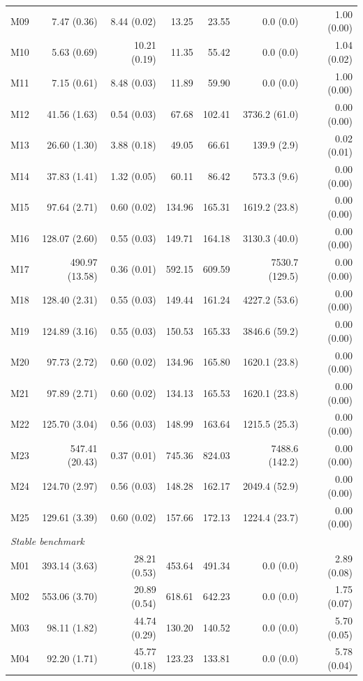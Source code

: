 \documentclass[11pt]{article}
\theoremstyle{remark}
\begin{document}
\begin{longtable}{lrrrrrr}
M09 & 7.47 (0.36) & 8.44 (0.02) & 13.25 & 23.55 & 0.0 (0.0) & 1.00 (0.00) \\
M10 & 5.63 (0.69) & 10.21 (0.19) & 11.35 & 55.42 & 0.0 (0.0) & 1.04 (0.02) \\
M11 & 7.15 (0.61) & 8.48 (0.03) & 11.89 & 59.90 & 0.0 (0.0) & 1.00 (0.00) \\
M12 & 41.56 (1.63) & 0.54 (0.03) & 67.68 & 102.41 & 3736.2 (61.0) & 0.00 (0.00) \\
M13 & 26.60 (1.30) & 3.88 (0.18) & 49.05 & 66.61 & 139.9 (2.9) & 0.02 (0.01) \\
M14 & 37.83 (1.41) & 1.32 (0.05) & 60.11 & 86.42 & 573.3 (9.6) & 0.00 (0.00) \\
M15 & 97.64 (2.71) & 0.60 (0.02) & 134.96 & 165.31 & 1619.2 (23.8) & 0.00 (0.00) \\
M16 & 128.07 (2.60) & 0.55 (0.03) & 149.71 & 164.18 & 3130.3 (40.0) & 0.00 (0.00) \\
M17 & 490.97 (13.58) & 0.36 (0.01) & 592.15 & 609.59 & 7530.7 (129.5) & 0.00 (0.00) \\
M18 & 128.40 (2.31) & 0.55 (0.03) & 149.44 & 161.24 & 4227.2 (53.6) & 0.00 (0.00) \\
M19 & 124.89 (3.16) & 0.55 (0.03) & 150.53 & 165.33 & 3846.6 (59.2) & 0.00 (0.00) \\
M20 & 97.73 (2.72) & 0.60 (0.02) & 134.96 & 165.80 & 1620.1 (23.8) & 0.00 (0.00) \\
M21 & 97.89 (2.71) & 0.60 (0.02) & 134.13 & 165.53 & 1620.1 (23.8) & 0.00 (0.00) \\
M22 & 125.70 (3.04) & 0.56 (0.03) & 148.99 & 163.64 & 1215.5 (25.3) & 0.00 (0.00) \\
M23 & 547.41 (20.43) & 0.37 (0.01) & 745.36 & 824.03 & 7488.6 (142.2) & 0.00 (0.00) \\
M24 & 124.70 (2.97) & 0.56 (0.03) & 148.28 & 162.17 & 2049.4 (52.9) & 0.00 (0.00) \\
M25 & 129.61 (3.39) & 0.60 (0.02) & 157.66 & 172.13 & 1224.4 (23.7) & 0.00 (0.00) \\
\multicolumn{7}{l}{\textit{Stable benchmark}} \\
M01 & 393.14 (3.63) & 28.21 (0.53) & 453.64 & 491.34 & 0.0 (0.0) & 2.89 (0.08) \\
M02 & 553.06 (3.70) & 20.89 (0.54) & 618.61 & 642.23 & 0.0 (0.0) & 1.75 (0.07) \\
M03 & 98.11 (1.82) & 44.74 (0.29) & 130.20 & 140.52 & 0.0 (0.0) & 5.70 (0.05) \\
M04 & 92.20 (1.71) & 45.77 (0.18) & 123.23 & 133.81 & 0.0 (0.0) & 5.78 (0.04) \\

\end{longtable}
\end{document}
